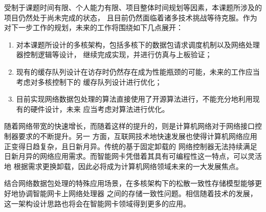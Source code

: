 
受制于课题时间有限、个人能力有限、项目整体时间规划等因素，本课题所涉及的项目仍然处于尚未完成的状态，
且目前仍然面临着诸多技术挑战等待克服。作为对下一步工作的规划，未来的工作将围绕如下几点展开：

\begin{enumerate}
  \item 对本课题所设计的多核架构，包括多核下的数据包请求调度机制以及网络处理器控制逻辑等设计，
  继续完成实现，并进行仿真与上板验证；
  \item 现有的缓存队列设计在访存时仍然存在成为性能瓶颈的可能，未来的工作应当考虑对多核控制下的
  缓存队列设计进行优化；
  \item 目前实现网络数据包处理的算法直接使用了开源算法进行，不能充分地利用现有的硬件设计，未来
  应当考虑对算法进行优化。
\end{enumerate}

随着网络带宽的快速增长，而随着这样的提升的，则是计算机网络对于网络接口控制器要求的不断提升。另一
方面，互联网技术地快速发展也使得计算机网络应用正变得日趋复杂，且日新月异。传统的基于固定卸载的
网络控制器无法持续满足日新月异的网络应用需求。而智能网卡凭借着其具有可编程性这一特点，可以灵活地
根据需求更换卸载，因此必将成为计算机网络领域未来的一大发展焦点。

结合网络数据包处理的特殊应用场景，在多核架构下的松散一致性存储模型能够更好地协调智能网卡上网络处理器
之间的存储一致性问题。相信随着技术的发展，这一架构设计思路也将会在智能网卡领域得到更多的应用。
